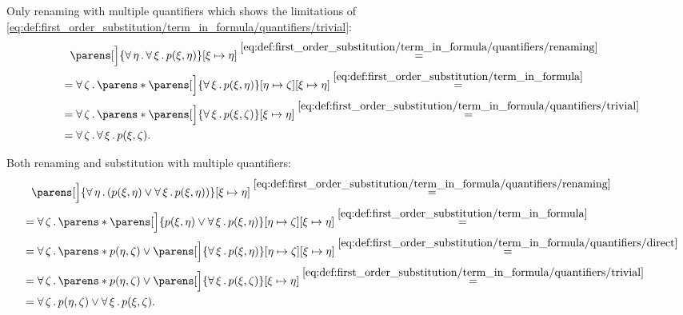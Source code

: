 \begin{example}
\begin{exenum}
     Only renaming with multiple quantifiers which shows the limitations of \eqref{eq:def:first_order_substitution/term_in_formula/quantifiers/trivial}:
    \begin{align*}
      &{}\phantom{=}{}
      \parens[\Big]{\qforall{\eta} \qforall{\xi} p(\xi, \eta)}[\xi \mapsto \eta]
      \overset {\eqref{eq:def:first_order_substitution/term_in_formula/quantifiers/renaming}} = \\ &=
      \qforall{\zeta} \parens*{ \parens[\Big]{ \qforall{\xi} p(\xi, \eta) }[\eta \mapsto \zeta][\xi \mapsto \eta]}
      \overset {\eqref{eq:def:first_order_substitution/term_in_formula}} = \\ &=
      \qforall{\zeta} \parens*{ \parens[\Big]{ \qforall{\xi} p(\xi, \zeta) }[\xi \mapsto \eta]}
      \overset {\eqref{eq:def:first_order_substitution/term_in_formula/quantifiers/trivial}} = \\ &=
      \qforall{\zeta} \qforall{\xi} p(\xi, \zeta).
    \end{align*}

     Both renaming and substitution with multiple quantifiers:
    \begin{align*}
      &{}\phantom{=}{}
      \parens[\Big]{ \qforall{\eta} (p(\xi, \eta) \vee \qforall{\xi} p(\xi, \eta)) }[\xi \mapsto \eta]
      \overset {\eqref{eq:def:first_order_substitution/term_in_formula/quantifiers/renaming}} = \\ &=
      \qforall{\zeta} \parens*{ \parens[\Big]{ p(\xi, \eta) \vee \qforall{\xi} p(\xi, \eta) }[\eta \mapsto \zeta][\xi \mapsto \eta] }
      \overset {\eqref{eq:def:first_order_substitution/term_in_formula}} = \\ &=
      \qforall{\zeta} \parens*{ p(\eta, \zeta) \vee \parens[\Big]{ \qforall{\xi} p(\xi, \eta) }[\eta \mapsto \zeta][\xi \mapsto \eta] }
      \overset {\eqref{eq:def:first_order_substitution/term_in_formula/quantifiers/direct}} = \\ &=
      \qforall{\zeta} \parens*{ p(\eta, \zeta) \vee \parens[\Big]{ \qforall{\xi} p(\xi, \zeta) }[\xi \mapsto \eta] }
      \overset {\eqref{eq:def:first_order_substitution/term_in_formula/quantifiers/trivial}} = \\ &=
      \qforall{\zeta} p(\eta, \zeta) \vee \qforall{\xi} p(\xi, \zeta).
    \end{align*}


\end{exenum}
\end{example}
